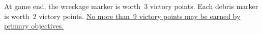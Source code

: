 \begin{scoring}
  
\begin{primaries}

  At game end, the wreckage marker is worth~3 victory points.  Each
  debris marker is worth~2 victory points.  \underline{No more than~9
    victory points may be earned by primary objectives.}

\end{primaries}

\begin{secondaries}
  \seizeground
  \controlthefield

  \interrogation
  \seekanddestroy
\end{secondaries}

\end{scoring}
